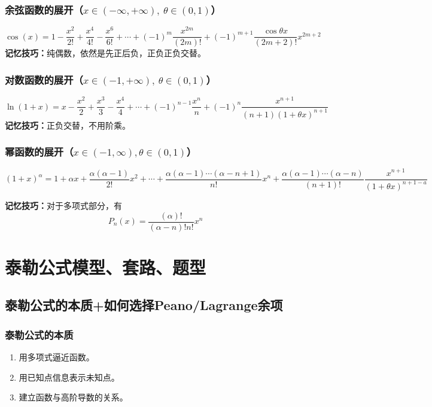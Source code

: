 \subsubsection{余弦函数的展开（$x\in(-\infty,+\infty),~\theta\in(0,1)$）}
\begin{equation}
	\cos(x)=1-\frac{x^2}{2!}+\frac{x^4}{4!}-\frac{x^6}{6!}+\cdots+(-1)^m\frac{x^{2m}}{(2m)!}+(-1)^{m+1}\frac{\cos\theta x}{(2m+2)!}x^{2m+2}
	\label{eq:5.8}
\end{equation}
\noindent\textbf{记忆技巧：}纯偶数，依然是先正后负，正负正负交替。

\subsubsection{对数函数的展开（$x\in(-1,+\infty),~\theta\in(0,1)$）}
\begin{equation}
	\ln(1+x)=x-\frac{x^2}{2}+\frac{x^3}{3}-\frac{x^4}{4}+\cdots+(-1)^{n-1}\frac{x^n}{n}+(-1)^n\frac{x^{n+1}}{(n+1)(1+\theta x)^{n+1}}
	\label{eq:5.9}
\end{equation}
\noindent\textbf{记忆技巧：}正负交替，不用阶乘。

\subsubsection{幂函数的展开（$x\in(-1,\infty),\theta\in(0,1)$）}
\begin{equation}
	(1+x)^{\alpha}=1+\alpha x+\frac{\alpha(\alpha-1)}{2!}x^2+\cdots+\frac{\alpha(\alpha-1)\cdots(\alpha-n+1)}{n!}x^{n}+\frac{\alpha(\alpha-1)\cdots(\alpha-n)}{(n+1)!}\frac{x^{n+1}}{(1+\theta x)^{n+1-a}}
\end{equation}

\noindent\textbf{记忆技巧：}对于多项式部分，有$$P_n(x)=\frac{(\alpha)!}{(\alpha-n)!n!}x^n$$


\section{泰勒公式模型、套路、题型}

\subsection{泰勒公式的本质+如何选择Peano/Lagrange余项}
\subsubsection{泰勒公式的本质}
\begin{enumerate}
	\item 用多项式逼近函数。
	\item 用已知点信息表示未知点。
	\item 建立函数与高阶导数的关系。
\end{enumerate}

